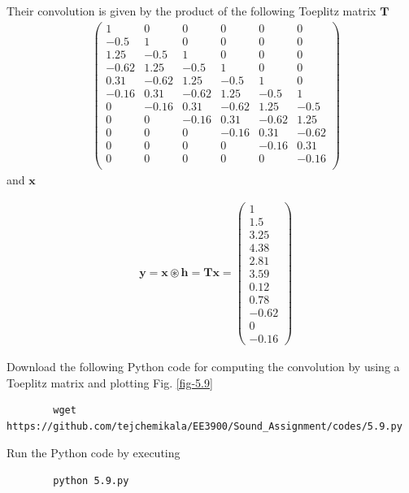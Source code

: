 \documentclass[journal,12pt,twocolumn]{IEEEtran}
\let\vec\mathbf
\numberwithin{equation}{section}
\renewcommand\thesection{\arabic{section}}
\newcommand{\myvec}[1]{\ensuremath{\begin{pmatrix}#1\end{pmatrix}}}
\begin{document}
\begin{enumerate}[label=\thesection.\arabic*]
	Their convolution is given by the product of the following Toeplitz matrix $\vec{T}$
	\begin{align}
		&\myvec{
			1 & 0 & 0 & 0 & 0 & 0 \\
			-0.5 & 1 & 0 & 0 & 0 & 0 \\
			1.25 & -0.5 & 1 & 0 & 0 & 0 \\
			-0.62 & 1.25 & -0.5 & 1 & 0 & 0 \\
			0.31 & -0.62 & 1.25 & -0.5 & 1 & 0 \\
			-0.16 & 0.31 & -0.62 & 1.25 & -0.5 & 1 \\
			0 & -0.16 & 0.31 & -0.62 & 1.25 & -0.5 \\
			0 & 0 & -0.16 & 0.31 & -0.62 & 1.25 \\
			0 & 0 & 0 & -0.16 & 0.31 & -0.62 \\
			0 & 0 & 0 & 0 & -0.16 & 0.31 \\
			0 & 0 & 0 & 0 & 0 & -0.16 \\
		} 
	\end{align}
	and $\vec{x}$
	
	\begin{align}
		&\vec{y} = \vec{x} \circledast \vec{h} = \vec{Tx} = \myvec{1 \\ 1.5 \\ 3.25 \\ 4.38 \\ 2.81 \\ 3.59 \\ 0.12 \\ 0.78 \\ -0.62 \\ 0 \\ -0.16}
	\end{align}
	
	Download the following Python code for computing the convolution by using a Toeplitz matrix and plotting Fig. \ref{fig-5.9}
	\begin{lstlisting}
		wget https://github.com/tejchemikala/EE3900/Sound_Assignment/codes/5.9.py
	\end{lstlisting}
	
	Run the Python code by executing
	\begin{lstlisting}
		python 5.9.py
	\end{lstlisting}


\end{enumerate}
\end{document}
